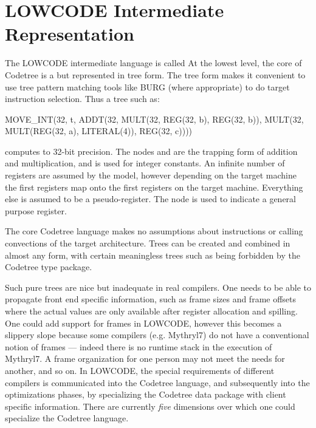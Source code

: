 \section{LOWCODE Intermediate Representation}
   The LOWCODE intermediate language is called 
    At the lowest level, the core of Codetree is a 
   but represented in tree form. The tree
   form makes it convenient to use tree pattern matching tools like
   BURG (where appropriate) to do target instruction selection. Thus a
   tree such as: 

   \begin{SML}  
  MOVE_INT(32, t, 
     ADDT(32, MULT(32, REG(32, b), REG(32, b)),
              MULT(32, MULT(REG(32, a), LITERAL(4)), REG(32, c))))
   \end{SML}

   computes  to 32-bit precision. 
   The nodes  and
    are the trapping form of addition and multiplication,
   and  is used for integer constants. An infinite number
   of registers are assumed by the model, however depending on the
   target machine the first  registers map onto the first
    registers on the target machine. Everything else is
   assumed to be a pseudo-register. The  node is used to
   indicate a  general purpose register. 

   
   The core Codetree language makes no assumptions about instructions or
   calling convections of the target architecture. Trees can be
   created and combined in almost any form, with certain meaningless
   trees such as  being forbidden by the
   Codetree type package.

    Such pure trees are nice but inadequate in real compilers. One
   needs to be able to propagate front end specific information, such
   as frame sizes and frame offsets where the actual values are only
   available after register allocation and spilling. One could add
   support for frames in LOWCODE, however this becomes a slippery slope
   because some compilers (e.g. Mythryl7) do not have a conventional
   notion of frames --- indeed there is no runtime stack in the
   execution of Mythryl7. A frame organization for one person may not
   meet the needs for another, and so on.  In LOWCODE, the special
   requirements of different compilers is communicated into the Codetree
   language, and subsequently into the optimizations phases, by
   specializing the Codetree data package with client specific
   information. There are currently \emph{five} dimensions over
   which one could specialize the Codetree language.

